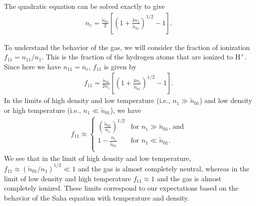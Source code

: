The quadratic equation can be solved exactly to give
\begin{align}
n_e = \frac{\tilde n_{01}}{2}
\left[\left(1 + \frac{4 n_1}{\tilde n_{01}}\right)^{1/2} - 1\right].
\end{align}

To understand the behavior of the gas, we will consider the fraction of ionization $f_{11} = n_{11} / n_1$. This is the fraction of the hydrogen atoms that are ionized to $\mathrm{H}^+$. Since here we have $n_{11} = n_e$, $f_{11}$ is given by
\begin{align}
f_{11} = \frac{\tilde n_{01}}{2n_1}
\left[\left(1 + \frac{4 n_1}{\tilde n_{01}}\right)^{1/2} - 1\right].
\end{align}
In the limits of high density and low temperature (i.e., $n_1 \gg \tilde n_{01}$) and low density or high temperature (i.e., $n_1 \ll \tilde n_{01}$), we have 
\begin{align}
f_{11} \approx
\left\{
\begin{array}{ll}
\left(\frac{\tilde n_{01}}{n_1}\right)^{1/2}&\mbox{for $n_1 \gg \tilde n_{01}$, and}\\
1 - \frac{n_1}{\tilde n_{01}}&\mbox{for $n_1 \ll \tilde n_{01}$.}\\
\end{array}
\right.
\end{align}
We see that in the limit of high density and low temperature, $f_{11} \approx (\tilde n_{01}/n_1)^{1/2} \ll 1$ and the gas is almost completely neutral, whereas in the limit of low density and high temperature $f_{11} \approx 1$ and the gas is almost completely ionized. These limits correspond to our expectations based on the behavior of the Saha equation with temperature and density.


